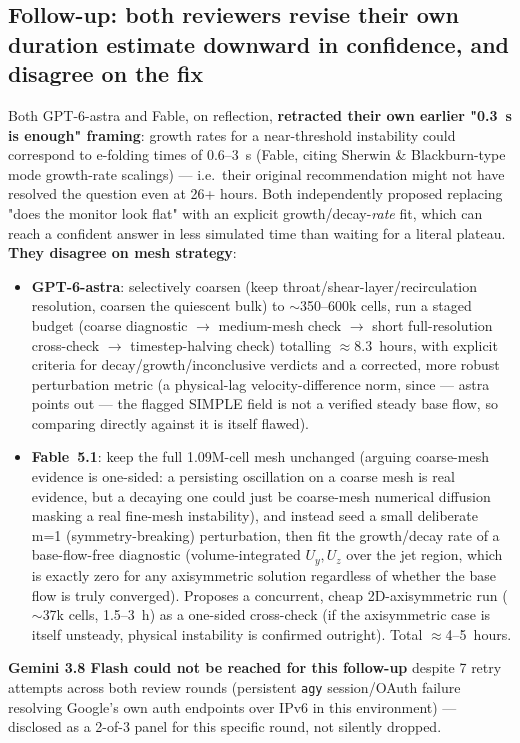 \documentclass[11pt]{article}
\begin{document}
\subsection*{Follow-up: both reviewers revise their own duration estimate downward in confidence,
and disagree on the fix}
Both GPT-6-astra and Fable, on reflection, \textbf{retracted their own earlier "0.3~s is enough"
framing}: growth rates for a near-threshold instability could correspond to e-folding times of
0.6--3~s (Fable, citing Sherwin \& Blackburn-type mode growth-rate scalings) --- i.e.\ their original
recommendation might not have resolved the question even at 26+ hours. Both independently proposed
replacing "does the monitor look flat" with an explicit growth/decay-\emph{rate} fit, which can reach
a confident answer in less simulated time than waiting for a literal plateau. \textbf{They disagree on
mesh strategy}:
\begin{itemize}
\item \textbf{GPT-6-astra}: selectively coarsen (keep throat/shear-layer/recirculation resolution,
coarsen the quiescent bulk) to $\sim$350--600k cells, run a staged budget (coarse diagnostic $\to$
medium-mesh check $\to$ short full-resolution cross-check $\to$ timestep-halving check) totalling
$\approx$8.3~hours, with explicit criteria for decay/growth/inconclusive verdicts and a corrected,
more robust perturbation metric (a physical-lag velocity-difference norm, since --- astra points out
--- the flagged SIMPLE field is not a verified steady base flow, so comparing directly against it is
itself flawed).
\item \textbf{Fable~5.1}: keep the full 1.09M-cell mesh unchanged (arguing coarse-mesh evidence is
one-sided: a persisting oscillation on a coarse mesh is real evidence, but a decaying one could just
be coarse-mesh numerical diffusion masking a real fine-mesh instability), and instead seed a small
deliberate m=1 (symmetry-breaking) perturbation, then fit the growth/decay rate of a base-flow-free
diagnostic (volume-integrated $U_y,U_z$ over the jet region, which is exactly zero for any axisymmetric
solution regardless of whether the base flow is truly converged). Proposes a concurrent, cheap
2D-axisymmetric run ($\sim$37k cells, 1.5--3~h) as a one-sided cross-check (if the axisymmetric case
is itself unsteady, physical instability is confirmed outright). Total $\approx$4--5~hours.
\end{itemize}
\textbf{Gemini 3.8 Flash could not be reached for this follow-up} despite 7 retry attempts across both
review rounds (persistent \texttt{agy} session/OAuth failure resolving Google's own auth endpoints
over IPv6 in this environment) --- disclosed as a 2-of-3 panel for this specific round, not silently
dropped.
\end{document}
